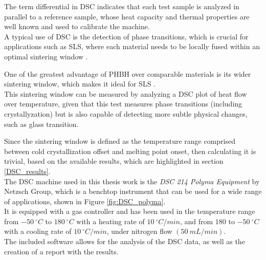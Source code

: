 \documentclass{article}
\begin{document}
            
            The term differential in DSC indicates that each test sample is analyzed in parallel to a reference sample, whose heat capacity and 
            thermal properties are well known and used to calibrate the machine. \\
            
            A typical use of DSC is the detection of phase transitions, which is crucial for applications such as SLS, where each material 
            needs to be locally fused within an optimal sintering window \autocites{Padovano_SLS_Review,SLS_3dprinting_biomedical_polymers}. 
    
            One of the greatest advantage of PHBH over comparable materials is its wider sintering window, which makes it ideal 
            for SLS \autocites{Kovalcik_PHA_Review,Eraslan_PHBH_review}. \\ 
    
            This sintering window can be measured by analyzing a DSC plot of heat flow over temperature, given that this test measures 
            phase transitions (including crystallyzation) but is also capable of detecting more subtle physical changes, such as glass transition. 
    
            Since the sintering window is defined as the temperature range comprised between cold crystallization offset and 
            melting point onset, then calculating it is trivial, based on the available results, which are highlighted in section \ref{DSC_results}. \\ 

                The DSC machine used in this thesis work is the \textit{DSC 214 Polyma Equipment} by Netzsch Group, which is a benchtop instrument that can be used for 
                a wide range of applications, shown in Figure \ref{fig:DSC_polyma}. \\ 

                It is equipped with a gas controller and has been used in the temperature range from $-50 \ ^{\circ} C$ 
                to $180 \ ^{\circ} C$ with 
                a heating rate of $10 \ ^{\circ}C/min$, and from $180$ to $-50 \ ^{\circ}C$ with a cooling rate of $10  \ ^{\circ}C/min$, 
                under nitrogen flow $(50 \ mL/min)$. \\ 

                The included software allows for the analysis of the 
                DSC data, as well as the creation of a report with the results. \\ 
\end{document}
